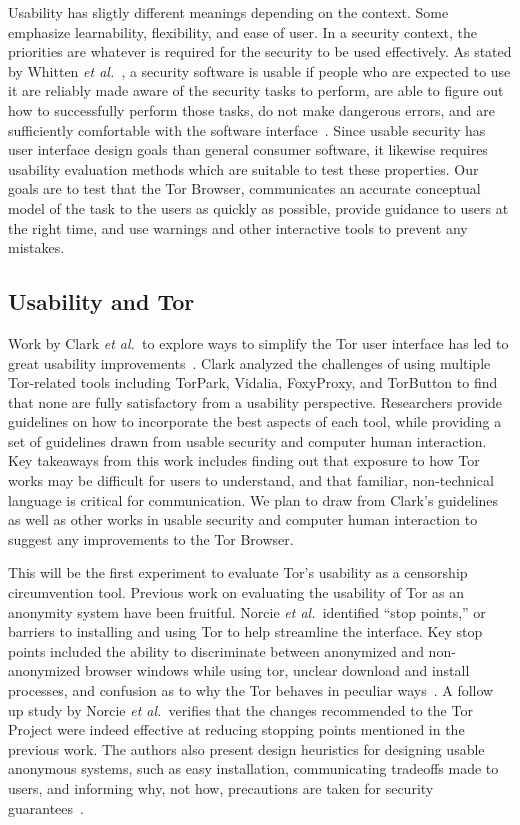 \documentclass[letterpaper,twocolumn,11pt]{article}
\def\etal{{\it et al.~}}
\begin{document}
Usability has sligtly different meanings depending on the context. Some emphasize
learnability, flexibility, and ease of user. In a security context, the priorities are whatever is 
required for the security to be used effectively. As stated by Whitten \etal, a security software is 
usable if people who are expected to use it are reliably made aware of the security tasks to perform, 
are able to figure out how to successfully perform those tasks, do not make dangerous errors, and
are sufficiently comfortable with the software interface~\cite{whitten1999johnny}. Since usable security 
has user interface design goals than general consumer software, it likewise requires usability evaluation
methods which are suitable to test these properties. Our goals are to test that the Tor Browser, 
communicates an accurate conceptual model of the task to the users as quickly as possible, provide guidance to 
users at the right time, and use warnings and other interactive tools to prevent any mistakes. 

\subsection{Usability and Tor}
\indent \indent  Work by Clark \etal to explore ways to simplify the Tor user interface
has led to great usability improvements~\cite{clark2007usability}.  Clark analyzed the challenges 
of using multiple Tor-related tools including TorPark, Vidalia, FoxyProxy, and TorButton to find that
none are fully satisfactory from a usability perspective. Researchers provide guidelines on 
how to incorporate the best aspects of each tool, while providing a set of guidelines drawn from
usable security and computer human interaction. Key takeaways from this work includes 
finding out that exposure to how Tor works may be difficult for users to understand, and that 
familiar, non-technical language is critical for communication. We plan to draw from Clark's
guidelines as well as other works in usable security and computer human interaction to suggest
any improvements to the Tor Browser. 

This will be the first experiment to evaluate Tor's usability as a censorship circumvention tool.
Previous work on evaluating the usability of Tor as an anonymity system have been fruitful. 
Norcie \etal identified ``stop points,'' or barriers to installing and using Tor to help streamline
the interface. Key stop points included the ability to discriminate between anonymized and non-
anonymized browser windows while using tor, unclear download and install processes, and 
confusion as to why the Tor behaves in peculiar ways~\cite{norcie2012eliminating}. A follow up
study by Norcie \etal verifies that the changes recommended to the Tor Project were indeed 
effective at reducing stopping points mentioned in the previous work. The authors also present
design heuristics for designing usable anonymous systems, such as easy installation, communicating
tradeoffs made to users, and informing why, not how, precautions are taken for security guarantees~\cite{norcie2014johnny}. 
\end{document}
